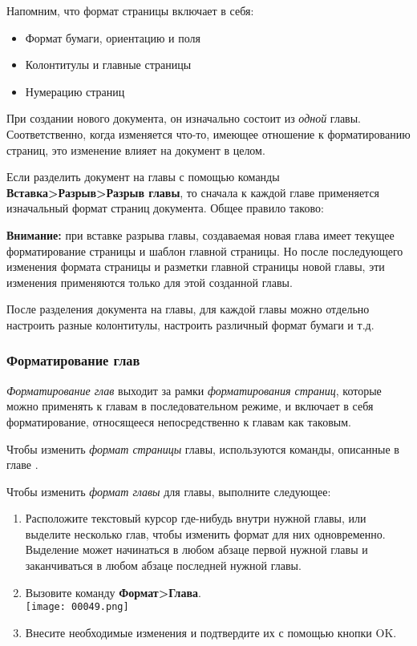 ﻿\documentclass[a4paper,10pt]{article}
\begin{document}
Напомним, что формат страницы включает в себя:
\begin{itemize}
 \item Формат бумаги, ориентацию и поля
 \item Колонтитулы и главные страницы
 \item Нумерацию страниц
\end{itemize}

При создании нового документа, он изначально состоит из \textit{одной} главы. Соответственно, когда изменяется что-то, имеющее отношение к форматированию страниц, это изменение влияет на документ в целом.

Если разделить документ на главы с помощью команды \textbf{Вставка>Разрыв>Разрыв главы}, то сначала к каждой главе применяется изначальный формат страниц документа. Общее правило таково:

\begin{mdframed}[backgroundcolor=blue!10]
\textbf{Внимание:} при вставке разрыва главы, создаваемая новая глава имеет текущее форматирование страницы и шаблон главной страницы. Но после последующего изменения формата страницы и разметки главной страницы новой главы, эти изменения применяются только для этой созданной главы.
\end{mdframed}

После разделения документа на главы, для каждой главы можно отдельно настроить разные колонтитулы, настроить различный формат бумаги и т.д.

\subsubsection{Форматирование глав}
\textit{Форматирование глав} выходит за рамки \textit{форматирования страниц}, которые можно применять к главам в последовательном режиме, и включает в себя форматирование, относящееся непосредственно к главам как таковым.

Чтобы изменить \textit{формат страницы} главы, используются команды, описанные в главе .

Чтобы изменить \textit{формат главы} для главы, выполните следующее:
\begin{enumerate}
 \item Расположите текстовый курсор где-нибудь внутри нужной главы, или выделите несколько глав, чтобы изменить формат для них одновременно. Выделение может начинаться в любом абзаце первой нужной главы и заканчиваться в любом абзаце последней нужной главы.
 \item Вызовите команду \textbf{Формат>Глава}.\\
 \texttt{[image: 00049.png]}
 \item Внесите необходимые изменения и подтвердите их с помощью кнопки OK.
\end{enumerate}
\end{document}
